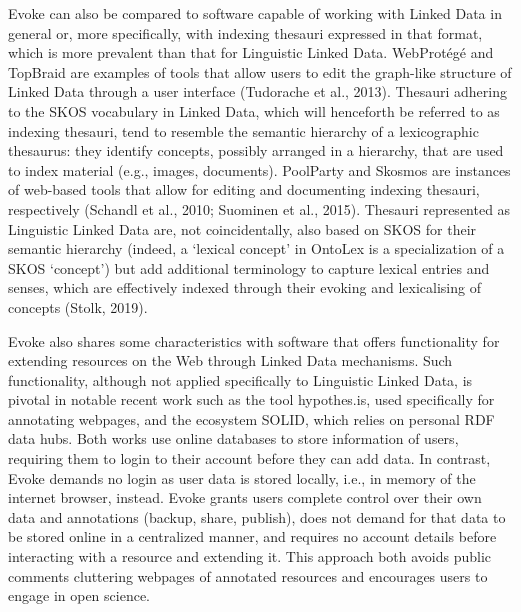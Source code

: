 Evoke can also be compared to software capable of working with Linked Data in general or, more specifically, with indexing thesauri expressed in that format, which is more prevalent than that for Linguistic Linked Data. WebProtégé and TopBraid are examples of tools that allow users to edit the graph-like structure of Linked Data through a user interface (Tudorache et al., 2013).  Thesauri adhering to the SKOS vocabulary in Linked Data, which will henceforth be referred to as indexing thesauri, tend to resemble the semantic hierarchy of a lexicographic thesaurus: they identify concepts, possibly arranged in a hierarchy, that are used to index material (e.g., images, documents). PoolParty and Skosmos are instances of web-based tools that allow for editing and documenting indexing thesauri, respectively (Schandl et al., 2010; Suominen et al., 2015). Thesauri represented as Linguistic Linked Data are, not coincidentally, also based on SKOS for their semantic hierarchy (indeed, a ‘lexical concept’ in OntoLex is a specialization of a SKOS ‘concept’) but add additional terminology to capture lexical entries and senses, which are effectively indexed through their evoking and lexicalising of concepts (Stolk, 2019).

Evoke also shares some characteristics with software that offers functionality for extending resources on the Web through Linked Data mechanisms. Such functionality, although not applied specifically to Linguistic Linked Data, is pivotal in notable recent work such as the tool hypothes.is,  used specifically for annotating webpages, and the ecosystem SOLID, which relies on personal RDF data hubs.  Both works use online databases to store information of users, requiring them to login to their account before they can add data. In contrast, Evoke demands no login as user data is stored locally, i.e., in memory of the internet browser, instead. Evoke grants users complete control over their own data and annotations (backup, share, publish), does not demand for that data to be stored online in a centralized manner, and requires no account details before interacting with a resource and extending it. This approach both avoids public comments cluttering webpages of annotated resources and encourages users to engage in open science. 

